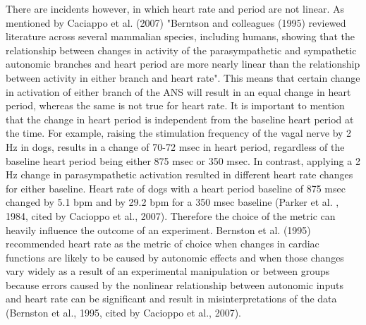 There are incidents however, in which heart rate and period are not linear. As mentioned by Caciappo et al. (2007) "Berntson and colleagues (1995) reviewed literature across several mammalian species, including
humans, showing that the relationship between changes in activity of the parasympathetic and sympathetic autonomic branches and heart period are more nearly linear than the relationship between activity in either branch and heart rate". This means that certain change in activation of either branch of the ANS will result in an equal change in heart period, whereas the same is not true for heart rate. It is important to mention that the change in heart period is independent from the baseline heart period at the time. For example,  raising the stimulation frequency of the vagal nerve by 2 Hz in dogs, results in a change of 70-72 msec in heart period, regardless of the baseline heart period being either 875 msec or 350 msec. In contrast, applying a 2 Hz change in parasympathetic activation resulted in different heart rate changes for either baseline. Heart rate of dogs with a heart period baseline of 875 msec changed by 5.1 bpm and by 29.2 bpm for a 350 msec baseline (Parker et al. , 1984, cited by Cacioppo et al., 2007). Therefore the choice of the metric can heavily influence the outcome of an experiment. Bernston et al. (1995) recommended heart rate as the metric of choice when changes in cardiac functions are likely to be caused by autonomic effects and when those changes vary widely as a result of an experimental manipulation or between groups because errors caused by the nonlinear relationship between autonomic inputs and heart rate can be significant and result in misinterpretations of the data (Bernston et al., 1995, cited by Cacioppo et al., 2007).

